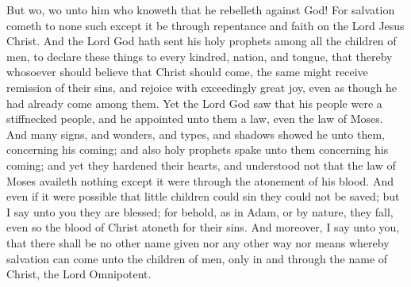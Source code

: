 But wo, wo unto him who knoweth that he rebelleth against God! For salvation cometh to none such except it be through repentance and faith on the Lord Jesus Christ.
\bverse \iffalse And the Lord God hath sent his holy prophets among all the children of men, to declare these things to every kindred, nation, and tongue, that thereby whosoever should believe that Christ should come, the same might receive remission of their sins, and rejoice with exceedingly great joy, even as though he had already come among them. \fi
And the Lord God hath sent his holy prophets among all the children of men, to declare these things to every kindred, nation, and tongue, that thereby whosoever should believe that Christ should come, the same might receive remission of their sins, and rejoice with exceedingly great joy, even as though he had already come among them.
\bverse \iffalse Yet the Lord God saw that his people were a stiffnecked people, and he appointed unto them a law, even the law of Moses. \fi
Yet the Lord God saw that his people were a stiffnecked people, and he appointed unto them a law, even the law of Moses.
\bverse \iffalse And many signs, and wonders, and types, and shadows showed he unto them, concerning his coming; and also holy prophets spake unto them concerning his coming; and yet they hardened their hearts, and understood not that the law of Moses availeth nothing except it were through the atonement of his blood. \fi
And many signs, and wonders, and types, and shadows showed he unto them, concerning his coming; and also holy prophets spake unto them concerning his coming; and yet they hardened their hearts, and understood not that the law of Moses availeth nothing except it were through the atonement of his blood.
\bverse \iffalse And even if it were possible that little children could sin they could not be saved; but I say unto you they are blessed; for behold, as in Adam, or by nature, they fall, even so the blood of Christ atoneth for their sins. \fi
And even if it were possible that little children could sin they could not be saved; but I say unto you they are blessed; for behold, as in Adam, or by nature, they fall, even so the blood of Christ atoneth for their sins.
\bverse \iffalse And moreover, I say unto you, that there shall be no other name given nor any other way nor means whereby salvation can come unto the children of men, only in and through the name of Christ, the Lord Omnipotent. \fi
And moreover, I say unto you, that there shall be no other name given nor any other way nor means whereby salvation can come unto the children of men, only in and through the name of Christ, the Lord Omnipotent.
